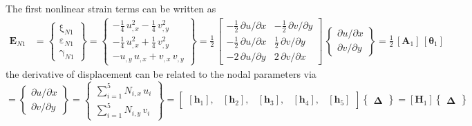 The first nonlinear strain terms can be written as 
\begin{equation}
\begin{aligned}
\mathbf{E}_{N1} & =  \begin{Bmatrix}
\mathrm \xi_{N1} \\
\mathrm \varepsilon_{N1} \\
\mathrm \gamma_{N1} \end{Bmatrix} =
 \begin{Bmatrix}
-\tfrac{1}{4} \, u_{,x}^2 -   \tfrac{1}{4} \, v_{,y}^2 \\
-\tfrac{1}{4} \, u_{,x}^2 + \tfrac{1}{4} \, v_{,y}^2 \\
-u_{,y} \, u_{,x} + v_{,x} \, v_{,y} \end{Bmatrix} = \frac{1}{2} \, \begin{bmatrix}
-\tfrac{1}{2} \, \partial u / \partial x &  - \tfrac{1}{2} \, \partial v / \partial y \\
-\tfrac{1}{2} \, \partial u / \partial x &  \tfrac{1}{2} \, \partial v / \partial y \\
-2 \, \partial u / \partial y  & 2 \, \partial v / \partial x  \end{bmatrix} \, \begin{Bmatrix}
\partial u / \partial x\\
\partial v / \partial y
\end{Bmatrix}
= \tfrac{1}{2} \, [\mathbf{A}_1] \, [\boldsymbol{\theta}_1]
\end{aligned}
\end{equation}
the derivative of displacement can be related to the nodal parameters via
\begin{equation}
[\boldsymbol{\theta}_1] =  \begin{Bmatrix}
\partial u / \partial x\\
\partial v / \partial y
\end{Bmatrix}
= \begin{Bmatrix}
\sum\nolimits_{i=1}^5 N_{i,x} \, u_i\\
\sum\nolimits_{i=1}^5 N_{i,y} \, v_i
\end{Bmatrix} 
= \begin{bmatrix}
[\mathbf{h}_1], & [\mathbf{h}_2], & [\mathbf{h}_3], & [\mathbf{h}_4], & [\mathbf{h}_5] 
\end{bmatrix}  \begin{Bmatrix} \boldsymbol{\Delta} \end{Bmatrix}  
= [\mathbf{H}_1] \begin{Bmatrix} \boldsymbol{\Delta} \end{Bmatrix} 
\end{equation}

